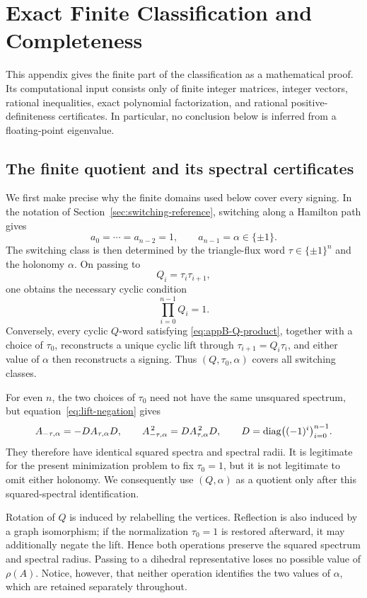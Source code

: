 \section{Exact Finite Classification and Completeness}
\label{app:finite-classification}

This appendix gives the finite part of the classification as a mathematical
proof.  Its computational input consists only of finite integer matrices,
integer vectors, rational inequalities, exact polynomial factorization, and
rational positive-definiteness certificates.  In particular, no conclusion
below is inferred from a floating-point eigenvalue.

\subsection{The finite quotient and its spectral certificates}
\label{app:finite-quotient}

We first make precise why the finite domains used below cover every signing.
In the notation of Section~\ref{sec:switching-reference}, switching along a
Hamilton path gives
\[
 a_0=\cdots=a_{n-2}=1,
 \qquad a_{n-1}=\alpha\in\{\pm1\}.
\]
The switching class is then determined by the triangle-flux word
\(\tau\in\{\pm1\}^n\) and the holonomy \(\alpha\).  On passing to
\[
 Q_i=\tau_i\tau_{i+1},
\]
one obtains the necessary cyclic condition
\begin{equation}\label{eq:appB-Q-product}
 \prod_{i=0}^{n-1}Q_i=1.
\end{equation}
Conversely, every cyclic \(Q\)-word satisfying
\eqref{eq:appB-Q-product}, together with a choice of \(\tau_0\), reconstructs
a unique cyclic lift through \(\tau_{i+1}=Q_i\tau_i\), and either value of
\(\alpha\) then reconstructs a signing.  Thus \((Q,\tau_0,\alpha)\) covers
all switching classes.

For even \(n\), the two choices of \(\tau_0\) need not have the same
unsquared spectrum, but equation~\eqref{eq:lift-negation} gives
\[
 A_{-\tau,\alpha}=-DA_{\tau,\alpha}D,
 \qquad
 A_{-\tau,\alpha}^{\,2}=DA_{\tau,\alpha}^{\,2}D,
 \qquad D=\operatorname{diag}\bigl((-1)^i\bigr)_{i=0}^{n-1}.
\]
They therefore have identical squared spectra and spectral radii.  It is
legitimate for the present minimization problem to fix \(\tau_0=1\), but it
is not legitimate to omit either holonomy.  We consequently use
\((Q,\alpha)\) as a quotient only after this squared-spectral identification.

Rotation of \(Q\) is induced by relabelling the vertices.  Reflection is
also induced by a graph isomorphism; if the normalization \(\tau_0=1\) is
restored afterward, it may additionally negate the lift.  Hence both
operations preserve the squared spectrum and spectral radius.  Passing to a
dihedral representative loses no possible value of \(\rho(A)\).  Notice,
however, that neither operation identifies the two values of \(\alpha\),
which are retained separately throughout.

